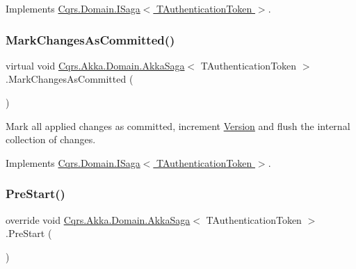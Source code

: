 Implements \hyperlink{interfaceCqrs_1_1Domain_1_1ISaga_a2714804684bc65cf4dec79b4697b9b21_a2714804684bc65cf4dec79b4697b9b21}{Cqrs.\+Domain.\+I\+Saga$<$ T\+Authentication\+Token $>$}.

\mbox{\label{classCqrs_1_1Akka_1_1Domain_1_1AkkaSaga_a83269fac4653cca097461e924feaea7f_a83269fac4653cca097461e924feaea7f}} 
\subsubsection{\texorpdfstring{Mark\+Changes\+As\+Committed()}{MarkChangesAsCommitted()}}
{\footnotesize\ttfamily virtual void \hyperlink{classCqrs_1_1Akka_1_1Domain_1_1AkkaSaga}{Cqrs.\+Akka.\+Domain.\+Akka\+Saga}$<$ T\+Authentication\+Token $>$.Mark\+Changes\+As\+Committed (\begin{DoxyParamCaption}{ }\end{DoxyParamCaption})\hspace{0.3cm}{\ttfamily [virtual]}}



Mark all applied changes as committed, increment \hyperlink{classCqrs_1_1Akka_1_1Domain_1_1AkkaSaga_a3fda31a3857e12a1aed60f4a4f04edd1_a3fda31a3857e12a1aed60f4a4f04edd1}{Version} and flush the internal collection of changes. 



Implements \hyperlink{interfaceCqrs_1_1Domain_1_1ISaga_a85c75f80bc5be4bad7f1d9f1231bfba7_a85c75f80bc5be4bad7f1d9f1231bfba7}{Cqrs.\+Domain.\+I\+Saga$<$ T\+Authentication\+Token $>$}.

\mbox{\label{classCqrs_1_1Akka_1_1Domain_1_1AkkaSaga_a4615beae56f595074f3ba643a890ba74_a4615beae56f595074f3ba643a890ba74}} 
\subsubsection{\texorpdfstring{Pre\+Start()}{PreStart()}}
{\footnotesize\ttfamily override void \hyperlink{classCqrs_1_1Akka_1_1Domain_1_1AkkaSaga}{Cqrs.\+Akka.\+Domain.\+Akka\+Saga}$<$ T\+Authentication\+Token $>$.Pre\+Start (\begin{DoxyParamCaption}{ }\end{DoxyParamCaption})\hspace{0.3cm}{\ttfamily [protected]}}



